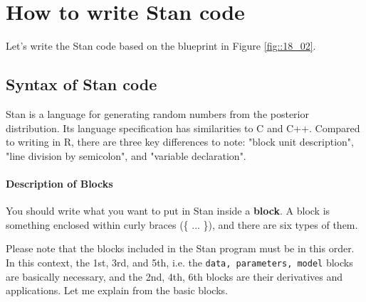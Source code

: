 \documentclass{ltjsbook}
\begin{document}
\section{How to write Stan code}
Let's write the Stan code based on the blueprint in Figure \ref{fig::18_02}.

\subsection{Syntax of Stan code}
Stan is a language for generating random numbers from the posterior distribution. Its language specification has similarities to C and C++. Compared to writing in R, there are three key differences to note: "block unit description", "line division by semicolon", and "variable declaration".

\paragraph{Description of Blocks}
You should write what you want to put in Stan inside a \textbf{block}. A block is something enclosed within curly braces (\{ ... \}), and there are six types of them.


Please note that the blocks included in the Stan program must be in this order.
In this context, the 1st, 3rd, and 5th, i.e. the \texttt{data, parameters, model} blocks are basically necessary, and the 2nd, 4th, 6th blocks are their derivatives and applications. Let me explain from the basic blocks.
\end{document}
